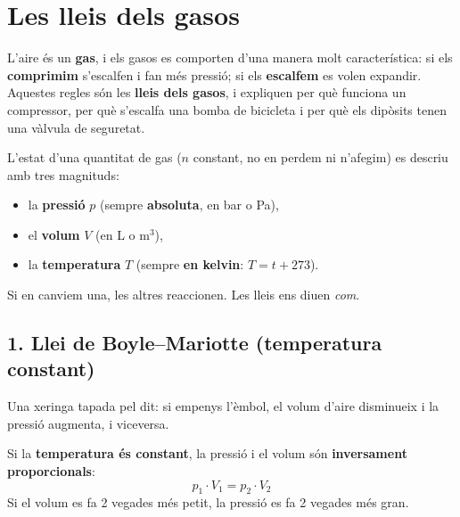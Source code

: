 \section{Les lleis dels gasos}

L'aire és un \textbf{gas}, i els gasos es comporten d'una manera molt característica: si els \textbf{comprimim} s'escalfen i fan més pressió; si els \textbf{escalfem} es volen expandir. Aquestes regles són les \textbf{lleis dels gasos}, i expliquen per què funciona un compressor, per què s'escalfa una bomba de bicicleta i per què els dipòsits tenen una vàlvula de seguretat.

\begin{idea}
L'estat d'una quantitat de gas ($n$ constant, no en perdem ni n'afegim) es descriu amb tres magnituds:
\begin{itemize}
 \item la \textbf{pressió} $p$ (sempre \textbf{absoluta}, en bar o Pa),
 \item el \textbf{volum} $V$ (en L o m$^3$),
 \item la \textbf{temperatura} $T$ (sempre \textbf{en kelvin}: $T = t + 273$).
\end{itemize}
Si en canviem una, les altres reaccionen. Les lleis ens diuen \emph{com}.
\end{idea}

\subsection*{1. Llei de Boyle--Mariotte (temperatura constant)}

Una xeringa tapada pel dit: si empenys l'èmbol, el volum d'aire disminueix i la pressió augmenta, i viceversa.

\begin{center}
\begin{minipage}{0.52\linewidth}
\begin{idea}
Si la \textbf{temperatura és constant}, la pressió i el volum són \textbf{inversament proporcionals}:
\[ p_1 \cdot V_1 = p_2 \cdot V_2 \]
Si el volum es fa 2 vegades més petit, la pressió es fa 2 vegades més gran.
\end{idea}
\end{minipage}\hfill
\begin{minipage}{0.4\linewidth}\centering
{}
\end{minipage}
\end{center}

